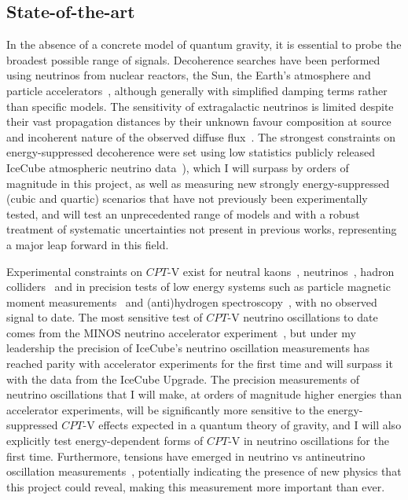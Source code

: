 \documentclass[a4paper,11pt]{article}
\begin{document}
\subsection{State-of-the-art}

In the absence of a concrete model of quantum gravity, it is essential to probe the broadest possible range of signals. Decoherence searches have been performed using neutrinos from nuclear reactors, the Sun, the Earth's atmosphere and particle accelerators~\cite{PhysRevLett.85.1166, Abbasi:2009nfa, PhysRevD.89.053002, Bakhti:2015dca, Coelho:2017zes, PhysRevD.95.113005, Coloma:2018idr, de_Holanda_2020}, although generally with simplified damping terms rather than specific models. The sensitivity of extragalactic neutrinos is limited despite their vast propagation distances by their unknown favour composition at source and incoherent nature of the observed diffuse flux~\cite{PhysRevD.102.115003}. The strongest constraints on energy-suppressed decoherence were set using low statistics publicly released IceCube atmospheric neutrino data~\cite{Coloma:2018idr}), which I will surpass by orders of magnitude in this project, as well as measuring new strongly energy-suppressed (cubic and quartic) scenarios that have not previously been experimentally tested, and will test an unprecedented range of models and with a robust treatment of systematic uncertainties not present in previous works, representing a major leap forward in this field.

Experimental constraints on $CPT$-V exist for neutral kaons~\cite{Ellis:1999xh, Ambrosino:2006ek, Abouzaid:2010ny, Babusci:2013gda, Schubert:2014ska}, neutrinos~\cite{Adamson:2013whj, Ohlsson:2014cha}, hadron colliders~\cite{Aad:2013eva, vanTilburg:2016awx} and in precision tests of low energy systems such as particle magnetic moment measurements~\cite{Bluhm:1997ci, Bennett:2007aa} and (anti)hydrogen spectroscopy~\cite{Kostelecky:2015nma}, with no observed signal to date. The most sensitive test of $CPT$-V neutrino oscillations to date comes from the MINOS neutrino accelerator experiment~\cite{Adamson:2013whj}, but under my leadership the precision of IceCube's neutrino oscillation measurements has reached parity with accelerator experiments for the first time and will surpass it with the data from the IceCube Upgrade. The precision measurements of neutrino oscillations that I will make, at orders of magnitude higher energies than accelerator experiments, will be significantly more sensitive to the energy-suppressed $CPT$-V effects expected in a quantum theory of gravity, and I will also explicitly test energy-dependent forms of $CPT$-V in neutrino oscillations for the first time. Furthermore, tensions have emerged in neutrino vs antineutrino oscillation measurements~\cite{Abe:2019vii,NOvA_CP_result}, potentially indicating the presence of new physics that this project could reveal, making this measurement more important than ever. \\
\end{document}
